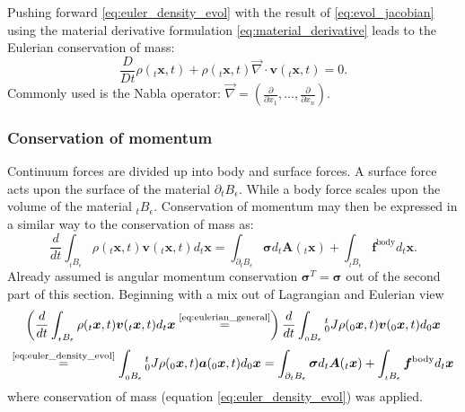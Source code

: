 \documentclass[m,times]{cgMA}
\begin{document}
Pushing forward \ref{eq:euler_density_evol} with the result of \ref{eq:evol_jacobian} using the material derivative formulation \ref{eq:material_derivative} leads to the Eulerian conservation of mass:
\begin{equation}
  \frac{D}{Dt}\rho(_t\boldsymbol{x},t) + \rho(_t\boldsymbol{x},t) \vec{\nabla} \cdot \boldsymbol{v}(_t\boldsymbol{x},t)=0.
\end{equation}
Commonly used is the Nabla operator: $\vec { \nabla } = \left( \frac { \partial } { \partial x _ { 1 } } , \dots , \frac { \partial } { \partial x _ { n } } \right)$.
\cite{MPM:COURSE}
\subsubsection{Conservation of momentum}
Continuum forces are divided up into body and surface forces. A surface force acts upon the surface of the material $\partial _tB_\epsilon$. While a body force scales upon the volume of the material $_tB_\epsilon$. Conservation of momentum may then be expressed in a similar way to the conservation of mass as:
\begin{equation}
  \frac { d } { d t } \int _ {_tB _ { \epsilon}  } \rho ( _t\boldsymbol{x} , t ) \boldsymbol{v} ( _t\boldsymbol{x} , t ) d _t\boldsymbol{x} = \int _ { \partial _tB _ {\epsilon  } } \boldsymbol{\sigma} d_t\boldsymbol{A} (_t\boldsymbol{x} ) + \int _ { _tB_\epsilon } \boldsymbol{f} ^ {\text{body} } d _t\boldsymbol{x}.
\end{equation}
Already assumed is angular momentum conservation $\boldsymbol{\sigma}^T  = \boldsymbol{\sigma} $ out of the second part of this section. Beginning with a mix out of Lagrangian and Eulerian view
$$\left(\frac { d } { d t } \int _ {_tB _ { \epsilon}  } \rho ( _t\boldsymbol{x} , t ) \boldsymbol{v} ( _t\boldsymbol{x} , t ) d _t\boldsymbol{x} \stackrel{\text{\ref{eq:eulerian_general}}}{=} \right)
\frac { d } { d t } \int _ {_0B _ { \epsilon}  } {^t_0J} \rho ( _0\boldsymbol{x} , t ) \boldsymbol{v} ( _0\boldsymbol{x} , t ) d _0\boldsymbol{x}$$
\begin{equation}
  \stackrel{\text{\ref{eq:euler_density_evol}}}{=}
  \int _ {_0B _ { \epsilon}  } {^t_0J} \rho ( _0\boldsymbol{x} , t ) \boldsymbol{a} ( _0\boldsymbol{x} , t ) d _0\boldsymbol{x}
  = \int _ { \partial _tB _ {\epsilon  } } \boldsymbol{\sigma} d_t\boldsymbol{A} (_t\boldsymbol{x} ) + \int _ { _tB_\epsilon } \boldsymbol{f} ^ {\text{body} } d _t\boldsymbol{x}
\end{equation}
where conservation of mass (equation \ref{eq:euler_density_evol}) was applied.
\end{document}

